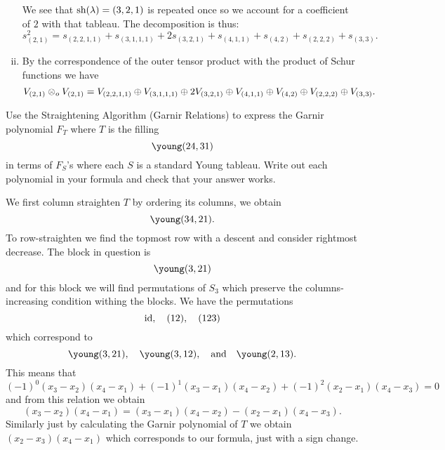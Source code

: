 \documentclass[12pt]{memoir}
\begin{document}
\begin{ptcbr}
\begin{enumerate}[i)]
\begin{itemize}
        \end{itemize}
        We see that $\text{sh}(\lambda)=(3,2,1)$ is repeated once so we account for a coefficient of $2$ with that tableau. The decomposition is thus:
        $$s_{(2,1)}^2=s_{(2,2,1,1)}+s_{(3,1,1,1)}+2s_{(3,2,1)}+s_{(4,1,1)}+s_{(4,2)}+s_{(2,2,2)}+s_{(3,3)}.$$
        \item By the correspondence of the outer tensor product with the product of Schur functions we have 
        $$V_{(2,1)}\otimes_o V_{(2,1)}=V_{(2,2,1,1)}\oplus V_{(3,1,1,1)}\oplus2V_{(3,2,1)}\oplus V_{(4,1,1)}\oplus V_{(4,2)}\oplus V_{(2,2,2)}\oplus V_{(3,3)}.$$
        
\end{enumerate}    
\end{ptcbr}

\begin{Ej}[Exercise 3]
    Use the Straightening Algorithm (Garnir Relations) to express the Garnir polynomial $F_T$ where $T$ is the filling 
    $$\young(24,31)$$
    in terms of $F_S$'s where each $S$ is a standard Young tableau.
    Write out each polynomial in your formula and check that your answer works.
\end{Ej}

\begin{ptcbr}
    We first column straighten $T$ by ordering its columns, we obtain
    $$\young(34,21).$$
    To row-straighten we find the topmost row with a descent and consider rightmost decrease. The block in question is 
    $$\young(3,21)$$
    and for this block we will find permutations of $S_3$ which preserve the columns-increasing condition withing the blocks. We have the permutations 
    $$\operatorname{id},\quad (12),\quad (123)$$
    which correspond to 
    $$\young(3,21),\quad \young(3,12),\word{and}\young(2,13).$$
    This means that 
    $$(-1)^0(x_3-x_2)(x_4-x_1)+(-1)^1(x_3-x_1)(x_4-x_2)+(-1)^2(x_2-x_1)(x_4-x_3)=0$$
    and from this relation we obtain 
    $$(x_3-x_2)(x_4-x_1)=(x_3-x_1)(x_4-x_2)-(x_2-x_1)(x_4-x_3).$$
    Similarly just by calculating the Garnir polynomial of $T$ we obtain $(x_2-x_3)(x_4-x_1)$ which corresponds to our formula, just with a sign change.
\end{ptcbr}
\end{document}
